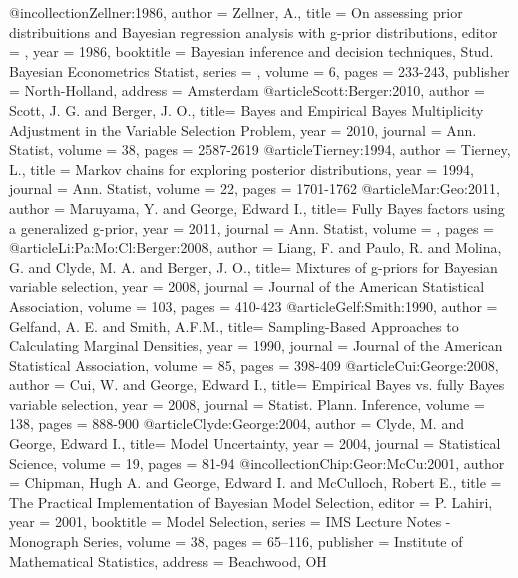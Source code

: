 @incollection{Zellner:1986,
    author = {Zellner, A.},
    title = {On assessing prior distribuitions and Bayesian regression analysis with g-prior distributions},
    editor = {},
    year = {1986},
    booktitle = {Bayesian inference and decision techniques, Stud. Bayesian Econometrics Statist},
    series = {},
    volume = {6},
    pages = {233-243},
    publisher = {North-Holland},
    address = {Amsterdam}
}
@article{Scott:Berger:2010,
    author = {Scott, J. G. and Berger, J. O.},
    title= {Bayes and Empirical Bayes Multiplicity Adjustment in the Variable Selection Problem},
    year = {2010},
    journal = {Ann. Statist},
    volume = {38},
    pages = {2587-2619}
}
@article{Tierney:1994,
    author = {Tierney, L.},
    title = {Markov chains for exploring posterior distributions},
    year = {1994},
    journal = {Ann. Statist},
    volume = {22},
    pages = {1701-1762}
}
@article{Mar:Geo:2011,
    author = {Maruyama, Y. and George, Edward I.},
    title= {Fully Bayes factors using a generalized g-prior},
    year = {2011},
    journal = {Ann. Statist},
    volume = {},
    pages = {}
}
@article{Li:Pa:Mo:Cl:Berger:2008,
    author = {Liang, F. and Paulo, R. and Molina, G. and  Clyde, M. A. and Berger, J. O.},
    title= {Mixtures of g-priors for Bayesian variable selection},
    year = {2008},
    journal = {Journal of the American Statistical Association},
    volume = {103},
    pages = {410-423}
}
@article{Gelf:Smith:1990,
    author = {Gelfand, A. E. and Smith, A.F.M.},
    title= {Sampling-Based Approaches to Calculating Marginal Densities},
    year = {1990},
    journal = {Journal of the American Statistical Association},
    volume = {85},
    pages = {398-409}
}
@article{Cui:George:2008,
    author = {Cui, W. and George, Edward I.},
    title= {Empirical Bayes vs. fully Bayes variable selection},
    year = {2008},
    journal = {Statist. Plann. Inference},
    volume = {138},
    pages = {888-900}
}
@article{Clyde:George:2004,
    author = {Clyde, M. and George, Edward I.},
    title= {Model Uncertainty},
    year = {2004},
    journal = {Statistical Science},
    volume = {19},
    pages = {81-94}
}
@incollection{Chip:Geor:McCu:2001,
    author = {Chipman, Hugh A. and George, Edward I. and McCulloch, Robert E.},
    title = {The Practical Implementation of {B}ayesian Model Selection},
    editor = {P. Lahiri},
    year = {2001},
    booktitle = {Model Selection},
    series = {IMS Lecture Notes - Monograph Series},
    volume = {38},
    pages = {65--116},
    publisher = {Institute of Mathematical Statistics},
    address = {Beachwood, OH}
}
